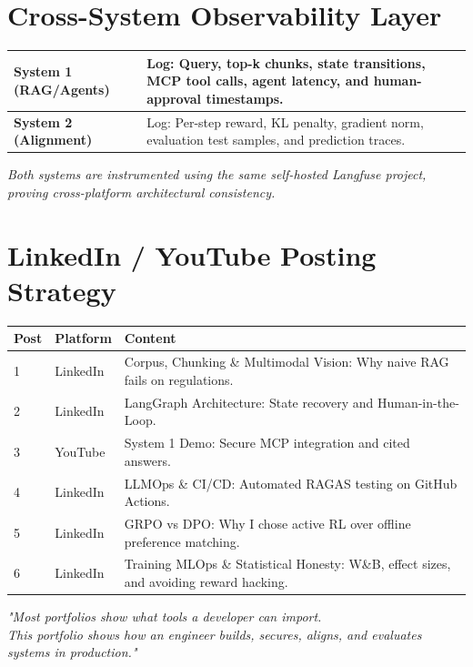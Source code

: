 \documentclass[11pt,a4paper]{article}
\begin{document}
\newpage
\section*{Cross-System Observability Layer}

\begin{tcolorbox}[systembox={ Langfuse Observability — Applied to Both Systems}]
\begin{tabularx}{\textwidth}{@{} l X @{}}
\toprule
\textbf{System 1 (RAG/Agents)} & Log: Query, top-k chunks, state transitions, MCP tool calls, agent latency, and human-approval timestamps. \\
\midrule
\textbf{System 2 (Alignment)} & Log: Per-step reward, KL penalty, gradient norm, evaluation test samples, and prediction traces. \\
\bottomrule
\end{tabularx}
\vspace{1em}
\textit{Both systems are instrumented using the same self-hosted Langfuse project, proving cross-platform architectural consistency.}
\end{tcolorbox}

\section*{LinkedIn / YouTube Posting Strategy}

\bigskip
\noindent
\begin{tabularx}{\textwidth}{@{} l l X @{}}
\toprule
\textbf{Post} & \textbf{Platform} & \textbf{Content} \\
\midrule
1 & LinkedIn & Corpus, Chunking \& Multimodal Vision: Why naive RAG fails on regulations. \\
2 & LinkedIn & LangGraph Architecture: State recovery and Human-in-the-Loop. \\
3 & YouTube & System 1 Demo: Secure MCP integration and cited answers. \\
4 & LinkedIn & LLMOps \& CI/CD: Automated RAGAS testing on GitHub Actions. \\
5 & LinkedIn & GRPO vs DPO: Why I chose active RL over offline preference matching. \\
6 & LinkedIn & Training MLOps \& Statistical Honesty: W\&B, effect sizes, and avoiding reward hacking. \\
\bottomrule
\end{tabularx}

\vspace{2cm}
\begin{center}
    \textit{"Most portfolios show what tools a developer can import. \\ This portfolio shows how an engineer builds, secures, aligns, and evaluates systems in production."}
\end{center}
\end{document}
